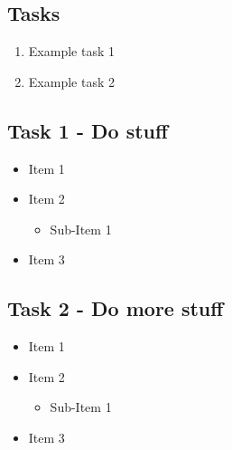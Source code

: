 \subsection*{Tasks}
\begin{enumerate}
    \item Example task 1
    \item Example task 2
\end{enumerate}

\subsection*{Task 1 - Do stuff}
\begin{itemize}
    \item Item 1
    \item Item 2
    \begin{itemize}
        \item Sub-Item 1
    \end{itemize}
    \item Item 3
\end{itemize}

\subsection*{Task 2 - Do more stuff}
\begin{itemize}
    \item Item 1
    \item Item 2
    \begin{itemize}
        \item Sub-Item 1
    \end{itemize}
    \item Item 3
\end{itemize}
